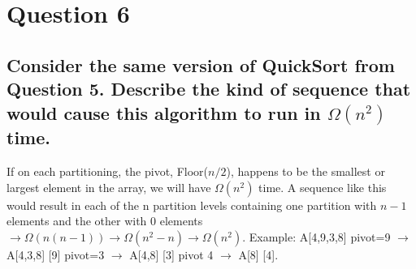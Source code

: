 \documentclass[11pt]{article}
\begin{document}
\section{Question 6}
\subsection{Consider the same version of QuickSort from Question 5. Describe the kind of sequence that would cause this algorithm to run in $ \Omega (n^2) $ time.}

If on each partitioning, the pivot, Floor($n/2$), happens to be the smallest or largest element in the array, we will have $ \Omega (n^2) $ time. A sequence like this would result in each of the n partition levels containing one partition with $n-1$ elements and the other with 0 elements $\rightarrow \Omega (n(n-1)) \rightarrow \Omega (n^2 - n) \rightarrow \Omega (n^2)$. Example: A[4,9,3,8] pivot=9 $\rightarrow$ A[4,3,8] [9] pivot=3 $\rightarrow$ A[4,8] [3] pivot 4 $\rightarrow$ A[8] [4].
\end{document}
